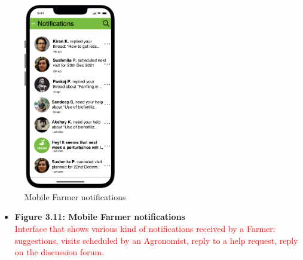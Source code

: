 \begin{figure}[H]
  \centering
     \includegraphics[width=40mm,scale=0.9]{./Images//Mocks/Mobile/Farmer_notif.png}
     \caption{Mobile Farmer notifications}
\end{figure}

\newpage


\begin{itemize}
    \item \textbf{Figure 3.11: Mobile Farmer notifications}\\ 
    \textcolor{red}{Interface that shows various kind of notifications received by a Farmer: suggestions, visits scheduled by an Agronomist, reply to a help request, reply on the discussion forum.}
\end{itemize}
\newpage